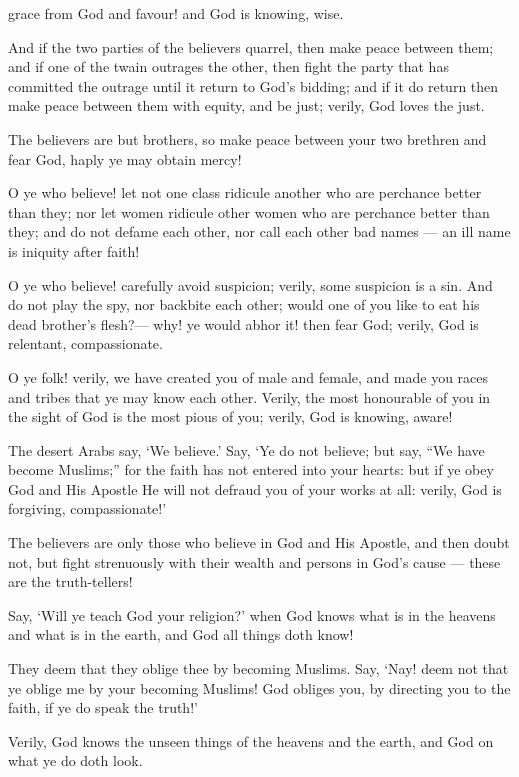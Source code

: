 \documentclass[fontsize=14pt, letterpaper, notitlepage, openany, DIV=12]{scrbook} %
\begin{document}
\noindent[49:8]
grace from God and favour! and God is knowing, wise.

\noindent[49:9]
And if the two parties of the believers quarrel, then make peace between them; and if one
of the twain outrages the other, then fight the party that has committed the outrage until it return
to God's bidding; and if it do return then make peace between them with equity, and be just;
verily, God loves the just.

\noindent[49:10]
The believers are but brothers, so make peace between your two brethren and fear God,
haply ye may obtain mercy!

\noindent[49:11]
O ye who believe! let not one class ridicule another who are perchance better than they;
nor let women ridicule other women who are perchance better than they; and do not defame each
other, nor call each other bad names --- an ill name is iniquity after faith!

\noindent[49:12]
O ye who believe! carefully avoid suspicion; verily, some suspicion is a sin. And do not
play the spy, nor backbite each other; would one of you like to eat his dead brother's flesh?---
why! ye would abhor it! then fear God; verily, God is relentant, compassionate.

\noindent[49:13]
O ye folk! verily, we have created you of male and female, and made you races and tribes
that ye may know each other. Verily, the most honourable of you in the sight of God is the most
pious of you; verily, God is knowing, aware!

\noindent[49:14]
The desert Arabs say, `We believe.' Say, `Ye do not believe; but say, ``We have become
Muslims;'' for the faith has not entered into your hearts: but if ye obey God and His Apostle He
will not defraud you of your works at all: verily, God is forgiving, compassionate!'

\noindent[49:15]
The believers are only those who believe in God and His Apostle, and then doubt not, but
fight strenuously with their wealth and persons in God's cause --- these are the truth-tellers!

\noindent[49:16]
Say, `Will ye teach God your religion?' when God knows what is in the heavens and
what is in the earth, and God all things doth know!

\noindent[49:17]
They deem that they oblige thee by becoming Muslims. Say, `Nay! deem not that ye
oblige me by your becoming Muslims! God obliges you, by directing you to the faith, if ye do
speak the truth!'

\noindent[49:18]
Verily, God knows the unseen things of the heavens and the earth, and God on what ye
do doth look.
\end{document}
